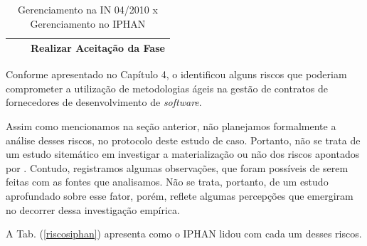 \begin{table}[H]
\begin{tabular}{|p{3.0cm}|p{4.0cm}|p{3.0cm}|p{4.0cm}|}
\multicolumn{2}{|l|}{}                                                                                                                                                                                                  &                                  & Realizar Aceitação da Fase                                                                                                      \\ \hline
\end{tabular}
\caption{Gerenciamento na IN 04/2010 x Gerenciamento no IPHAN}
\label{gctiiphan}
\end{table}


Conforme apresentado no Capítulo 4, o  identificou alguns riscos que poderiam comprometer a utilização de metodologias ágeis na gestão de contratos de fornecedores de desenvolvimento de \textit{software}. 

Assim como mencionamos na seção anterior, não planejamos formalmente a análise desses riscos, no protocolo deste estudo de caso. Portanto, não se trata de um estudo sitemático em investigar a materialização ou não dos riscos apontados por . Contudo, registramos algumas observações, que foram possíveis de serem feitas com as fontes que analisamos. Não se trata, portanto, de um estudo aprofundado sobre esse fator, porém, reflete algumas percepções que emergiram no decorrer dessa investigação empírica. 

A Tab. (\ref{riscosiphan}) apresenta como o IPHAN lidou com cada um desses riscos.

